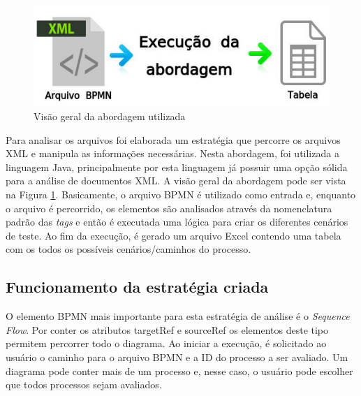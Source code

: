 \documentclass[12pt]{article}
\begin{document}
\begin{figure}[ht]
\centering
\includegraphics[width=.8\textwidth]{figuras/abordagem1.png}
\caption{Visão geral da abordagem utilizada}
\label{fig:abordagem1}
\end{figure}

Para analisar os arquivos foi elaborada um estratégia que percorre os arquivos XML e manipula as informações necessárias.  Nesta abordagem, foi utilizada a linguagem Java, principalmente por esta linguagem já possuir uma opção sólida para a análise de documentos XML\cite{javadom}. A visão geral da abordagem pode ser vista na Figura \ref{fig:abordagem1}. Basicamente, o arquivo BPMN é utilizado como entrada e, enquanto o arquivo é percorrido, os elementos são analisados através da nomenclatura padrão das \emph{tags} e então é executada uma lógica para criar os diferentes cenários de teste. Ao fim da execução, é gerado um arquivo Excel contendo uma tabela com os todos os possíveis cenários/caminhos do processo.


\subsection{Funcionamento da estratégia criada}


O elemento BPMN mais importante para esta estratégia de análise é o \emph{Sequence Flow}. Por conter os atributos targetRef e sourceRef os elementos deste tipo permitem percorrer todo o diagrama. Ao iniciar a execução, é solicitado ao usuário o caminho para o arquivo BPMN e a ID do processo a ser avaliado. Um diagrama pode conter mais de um processo e, nesse caso, o usuário pode escolher que todos processos sejam avaliados.
\end{document}
